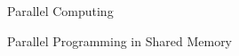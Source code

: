 \begin{section}{Parallel Computing}
\begin{subsection}{Parallel Programming in Shared Memory}
\end{subsection}

\end{section}
